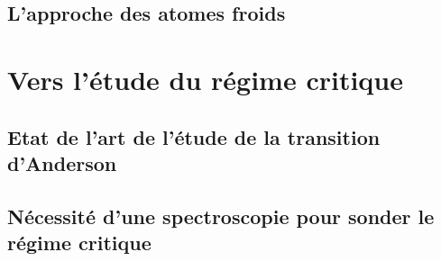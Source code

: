 \subsection{L'approche des atomes froids}
\lipsum[5]

\section{Vers l'étude du régime critique}
\subsection{Etat de l'art de l'étude de la transition d'Anderson}
\lipsum[6]
\subsection{Nécessité d'une spectroscopie pour sonder le régime critique}
\lipsum[7]



